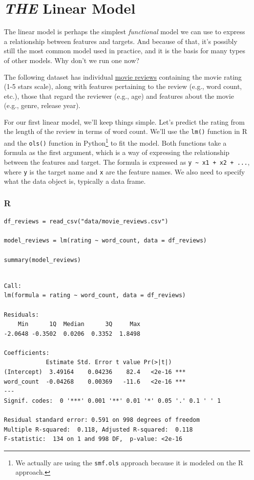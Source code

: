 \documentclass[
  letterpaper,
]{krantz}
\begin{document}
\section{\texorpdfstring{\emph{THE} Linear
Model}{THE Linear Model}}\label{sec-lm-linear-model}

The linear model is perhaps the simplest \emph{functional} model we can
use to express a relationship between features and targets. And because
of that, it's possibly still the most common model used in practice, and
it is the basis for many types of other models. Why don't we run one
now?

The following dataset has individual \hyperref[app-data-review]{movie
reviews} containing the movie rating (1-5 stars scale), along with
features pertaining to the review (e.g., word count, etc.), those that
regard the reviewer (e.g., age) and features about the movie (e.g.,
genre, release year).

For our first linear model, we'll keep things simple. Let's predict the
rating from the length of the review in terms of word count. We'll use
the \texttt{lm()} function in R and the \texttt{ols()} function in
Python\footnote{We actually are using the \texttt{smf.ols} approach
  because it is modeled on the R approach.} to fit the model. Both
functions take a formula as the first argument, which is a way of
expressing the relationship between the features and target. The formula
is expressed as \texttt{y\ \textasciitilde{}\ x1\ +\ x2\ +\ ...}, where
\texttt{y} is the target name and \texttt{x} are the feature names. We
also need to specify what the data object is, typically a data frame.

\subsubsection{R}

\begin{verbatim}
df_reviews = read_csv("data/movie_reviews.csv")

model_reviews = lm(rating ~ word_count, data = df_reviews)

summary(model_reviews)
\end{verbatim}

\begin{verbatim}

Call:
lm(formula = rating ~ word_count, data = df_reviews)

Residuals:
    Min      1Q  Median      3Q     Max 
-2.0648 -0.3502  0.0206  0.3352  1.8498 

Coefficients:
            Estimate Std. Error t value Pr(>|t|)    
(Intercept)  3.49164    0.04236    82.4   <2e-16 ***
word_count  -0.04268    0.00369   -11.6   <2e-16 ***
---
Signif. codes:  0 '***' 0.001 '**' 0.01 '*' 0.05 '.' 0.1 ' ' 1

Residual standard error: 0.591 on 998 degrees of freedom
Multiple R-squared:  0.118, Adjusted R-squared:  0.118 
F-statistic:  134 on 1 and 998 DF,  p-value: <2e-16
\end{verbatim}
\end{document}
